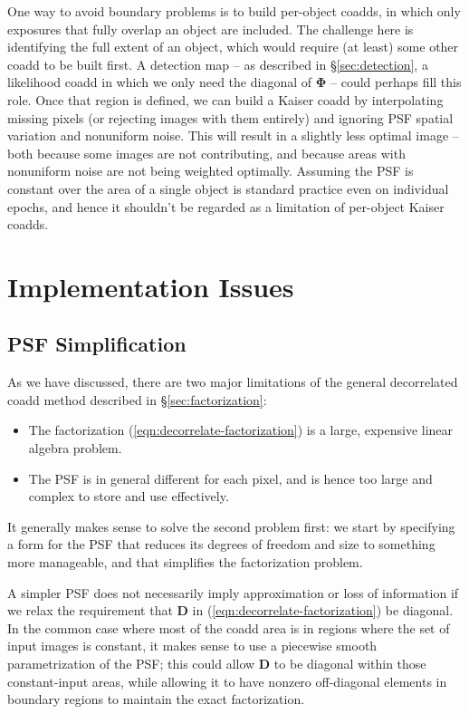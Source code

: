 \documentclass[10pt]{article}
\newcommand{\eqnref}[1]{(\ref{eqn:#1})}
\newcommand{\secref}[1]{\S\ref{sec:#1}}
\begin{document}
One way to avoid boundary problems is to build per-object coadds, in which only exposures that fully overlap an object are included.  The challenge here is identifying the full extent of an object, which would require (at least) some other coadd to be built first.  A detection map -- as described in \secref{detection}, a likelihood coadd in which we only need the diagonal of $\bm{\Phi}$ -- could perhaps fill this role.  Once that region is defined, we can build a Kaiser coadd by interpolating missing pixels (or rejecting images with them entirely) and ignoring PSF spatial variation and nonuniform noise.  This will result in a slightly less optimal image -- both because some images are not contributing, and because areas with nonuniform noise are not being weighted optimally.  Assuming the PSF is constant over the area of a single object is standard practice even on individual epochs, and hence it shouldn't be regarded as a limitation of per-object Kaiser coadds.

\section{Implementation Issues}
\label{sec:implementation}

\subsection{PSF Simplification}

As we have discussed, there are two major limitations of the general decorrelated coadd method described in \secref{factorization}:
\begin{itemize}
\item The factorization \eqnref{decorrelate-factorization} is a large, expensive linear algebra problem.
\item The PSF is in general different for each pixel, and is hence too large and complex to store and use effectively.
\end{itemize}
It generally makes sense to solve the second problem first: we start by specifying a form for the PSF that reduces its degrees of freedom and size to something more manageable, and that simplifies the factorization problem.

A simpler PSF does not necessarily imply approximation or loss of information if we relax the requirement that $\bm{D}$ in \eqnref{decorrelate-factorization} be diagonal.  In the common case where most of the coadd area is in regions where the set of input images is constant, it makes sense to use a piecewise smooth parametrization of the PSF; this could allow $\bm{D}$ to be diagonal within those constant-input areas, while allowing it to have nonzero off-diagonal elements in boundary regions to maintain the exact factorization.
\end{document}
